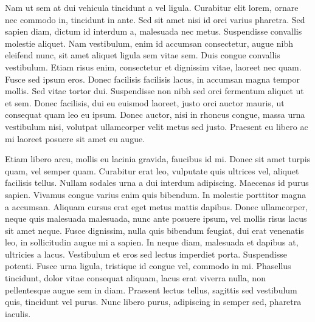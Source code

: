 Nam ut sem at dui vehicula tincidunt a vel ligula. Curabitur elit lorem, ornare nec commodo in, tincidunt in ante. Sed sit amet nisi id orci varius pharetra. Sed sapien diam, dictum id interdum a, malesuada nec metus. Suspendisse convallis molestie aliquet. Nam vestibulum, enim id accumsan consectetur, augue nibh eleifend nunc, sit amet aliquet ligula sem vitae sem. Duis congue convallis vestibulum. Etiam risus enim, consectetur et dignissim vitae, laoreet nec quam. Fusce sed ipsum eros. Donec facilisis facilisis lacus, in accumsan magna tempor mollis. Sed vitae tortor dui. Suspendisse non nibh sed orci fermentum aliquet ut et sem. Donec facilisis, dui eu euismod laoreet, justo orci auctor mauris, ut consequat quam leo eu ipsum. Donec auctor, nisi in rhoncus congue, massa urna vestibulum nisi, volutpat ullamcorper velit metus sed justo. Praesent eu libero ac mi laoreet posuere sit amet eu augue.

Etiam libero arcu, mollis eu lacinia gravida, faucibus id mi. Donec sit amet turpis quam, vel semper quam. Curabitur erat leo, vulputate quis ultrices vel, aliquet facilisis tellus. Nullam sodales urna a dui interdum adipiscing. Maecenas id purus sapien. Vivamus congue varius enim quis bibendum. In molestie porttitor magna a accumsan. Aliquam cursus erat eget metus mattis dapibus. Donec ullamcorper, neque quis malesuada malesuada, nunc ante posuere ipsum, vel mollis risus lacus sit amet neque. Fusce dignissim, nulla quis bibendum feugiat, dui erat venenatis leo, in sollicitudin augue mi a sapien. In neque diam, malesuada et dapibus at, ultricies a lacus. Vestibulum et eros sed lectus imperdiet porta. Suspendisse potenti. Fusce urna ligula, tristique id congue vel, commodo in mi. Phasellus tincidunt, dolor vitae consequat aliquam, lacus erat viverra nulla, non pellentesque augue sem in diam. Praesent lectus tellus, sagittis sed vestibulum quis, tincidunt vel purus. Nunc libero purus, adipiscing in semper sed, pharetra iaculis.
